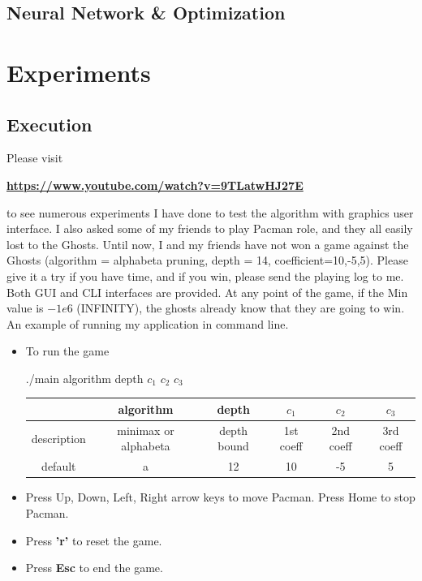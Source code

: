 \documentclass[a4paper, 11pt]{article}
\begin{document}
\subsection{Neural Network \& Optimization}

\newpage
\section{Experiments}
\subsection{Execution} 
Please visit 
\begin{center}\textbf{\url{https://www.youtube.com/watch?v=9TLatwHJ27E}} \end{center}
to see numerous experiments I have done to test the algorithm with graphics user interface. I also asked some of my friends to play Pacman role, and they all easily lost to the Ghosts. Until now, I and my friends have not won a game against the Ghosts (algorithm = alphabeta pruning, depth = 14, coefficient=10,-5,5). Please give it a try if you have time, and if you win, please send the playing log to me. \\
Both GUI and CLI interfaces are provided. At any point of the game, if the Min value is $-1e6$ (INFINITY), the ghosts already know that they are going to win.
An example of running my application in command line. 
\begin{itemize}
\item To run the game
\begin{center} ./main algorithm depth $c_1$ $c_2$ $c_3$ \end{center}
\begin{table}[ht]
  \centering
  \begin{tabular}{|c|c|c|c|c|c|}
    \hline
    & algorithm & depth & $c_1$ & $c_2$ & $c_3$ \\ \hline
    description & minimax or alphabeta & depth bound&1st coeff & 2nd coeff &3rd coeff \\ \hline
    default & a & 12 & 10 & -5 & 5 \\
    \hline
  \end{tabular}
\end{table}
\item Press Up, Down, Left, Right arrow keys to move Pacman. Press Home to stop Pacman.
\item Press \textbf{'r'} to reset the game. 
\item Press \textbf{Esc} to end the game.

\end{itemize}
\end{document}
